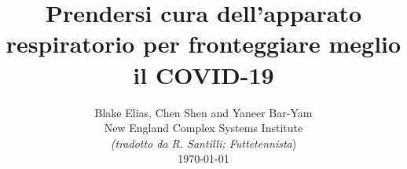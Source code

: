 \documentclass[onecolumn,journal]{IEEEtran}
\begin{document}
\title{\color{Brown} Prendersi cura dell'apparato respiratorio per fronteggiare meglio il COVID-19
 \\
\vspace{-0.35ex}}
\author{Blake Elias, Chen Shen and Yaneer Bar-Yam \\ New England Complex Systems Institute \\
\vspace{+0.35ex}
\small{\textit{(tradotto da R. Santilli; Futtetennista})}\\
 \today
  \vspace{-14ex} \\


\bigskip
\bigskip

\textbf{}
 }

\maketitle


\flushbottom %



\thispagestyle{empty} %




\renewcommand{\thefootnote}{\fnsymbol{footnote}}
\end{document}
